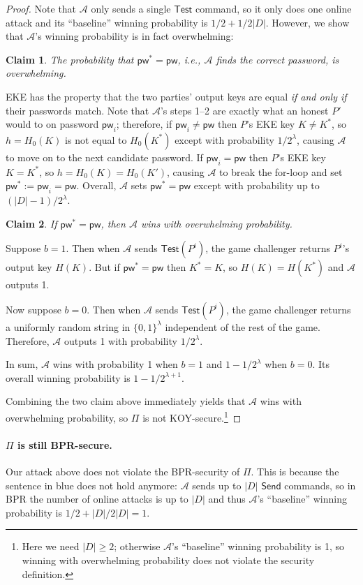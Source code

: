 \documentclass{article}
\newtheorem{claim}{Claim}
\newcommand{\adv}{\mathcal{A}}
\newcommand{\pw}{\mathsf{pw}}
\newcommand{\Send}{\mathsf{Send}}
\newcommand{\Test}{\mathsf{Test}}
\begin{document}
\begin{proof}
Note that {\color{blue}$\adv$ only sends a single $\Test$ command, so it only does one online attack and its ``baseline'' winning probability is $1/2 + 1/2|D|$}. However, we show that $\adv$'s winning probability is in fact overwhelming:
\begin{claim}
The probability that $\pw^* = \pw$, i.e., $\adv$ finds the correct password, is overwhelming.
\end{claim}
EKE has the property that the two parties' output keys are equal \emph{if and only if} their passwords match. Note that $\adv$'s steps 1--2 are exactly what an honest $P'$ would to on password $\pw_i$; therefore, if $\pw_i \neq \pw$ then $P$'s EKE key $K \neq K^*$, so $h = H_0(K)$ is not equal to $H_0(K^*)$ except with probability $1/2^\lambda$, causing $\adv$ to move on to the next candidate password. If $\pw_i = \pw$ then $P$'s EKE key $K = K^*$, so $h = H_0(K) = H_0(K')$, causing $\adv$ to break the for-loop and set $\pw^* := \pw_i = \pw$. Overall, $\adv$ sets $\pw^* = \pw$ except with probability up to $(|D|-1)/2^\lambda$.
\begin{claim}
If $\pw^* = \pw$, then $\adv$ wins with overwhelming probability.
\end{claim}
Suppose $b = 1$. Then when $\adv$ sends $\Test(P^i)$, the game challenger returns $P^i$'s output key $H(K)$. But if $\pw^* = \pw$ then $K^* = K$, so $H(K) = H(K^*)$ and $\adv$ outputs 1.

Now suppose $b = 0$. Then when $\adv$ sends $\Test(P^i)$, the game challenger returns a uniformly random string in $\{0,1\}^\lambda$ independent of the rest of the game. Therefore, $\adv$ outputs 1 with probability $1/2^\lambda$.

In sum, $\adv$ wins with probability 1 when $b = 1$ and $1-1/2^\lambda$ when $b = 0$. Its overall winning probability is $1-1/2^{\lambda+1}$.

\medskip
Combining the two claim above immediately yields that $\adv$ wins with overwhelming probability, so $\Pi$ is not KOY-secure.\footnote{Here we need $|D| \geq 2$; otherwise $\adv$'s ``baseline'' winning probability is 1, so winning with overwhelming probability does not violate the security definition.}
\end{proof}
\paragraph{$\Pi$ is still BPR-secure.}
Our attack above does not violate the BPR-security of $\Pi$. This is because the sentence in blue does not hold anymore: $\adv$ sends up to $|D|$ $\Send$ commands, so in BPR the number of online attacks is up to $|D|$ and thus $\adv$'s ``baseline'' winning probability is $1/2 + |D|/2|D| = 1$.
\end{document}
